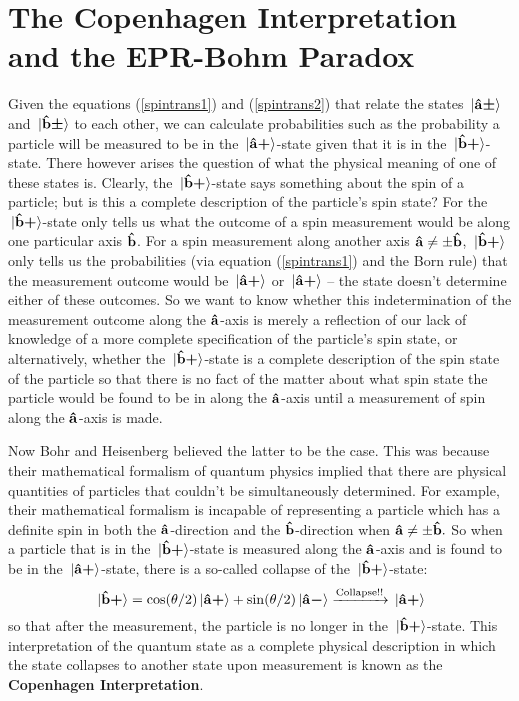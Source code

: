 \section{The Copenhagen Interpretation and the EPR-Bohm Paradox}
Given the equations (\ref{spintrans1}) and (\ref{spintrans2}) that  relate the states $\ket*{\vb{\hat{{a}}}\bm{\pm}}$ and $\ket*{\vb{\hat{{b}}}\bm{\pm}}$ to each other, we can calculate probabilities such as the probability a particle will be measured to be in the $\ket*{\vb{\hat{{a}}}\bm{+}}$-state given that it is in the $\ket*{\vb{\hat{{b}}}\bm{+}}$-state. There however arises the question of what the physical meaning of one of these states is. Clearly, the $\ket*{\vb{\hat{{b}}}\bm{+}}$-state says something about the spin of a particle; but is this a complete description of the particle's spin state? For the $\ket*{\vb{\hat{{b}}}\bm{+}}$-state only tells us what the outcome of a spin measurement would be along one particular axis $\vb{\hat{{b}}}$. For a spin measurement along another axis $\vb{\hat{{a}}}\neq\pm\vb{\hat{{b}}}$, $\ket*{\vb{\hat{{b}}}\bm{+}}$ only tells us the probabilities (via equation (\ref{spintrans1}) and the Born rule) that the measurement outcome would be $\ket*{\vb{\hat{{a}}}\bm{+}}$ or $\ket*{\vb{\hat{{a}}}\bm{+}}$ -- the state doesn't determine either of these outcomes. So we want to know whether this indetermination of the measurement outcome along the $\vb{\hat{{a}}}$-axis is merely a reflection of our lack of knowledge of a more complete specification of the particle's spin state, or alternatively, whether the  $\ket*{\vb{\hat{{b}}}\bm{+}}$-state is a complete description of the spin state of the particle so that there is no fact of the matter about what spin state the particle would be found to be in along the $\vb{\hat{{a}}}$-axis until a measurement of spin along the $\vb{\hat{{a}}}$-axis is made. 

Now Bohr and Heisenberg believed the latter to be the case. This was because their mathematical formalism of quantum physics implied that there are physical quantities of particles that couldn't be simultaneously determined. For example, their mathematical formalism is incapable of representing a particle which has a definite spin in both the $\vb{\hat{{a}}}$-direction and the $\vb{\hat{{b}}}$-direction when $\vb{\hat{{a}}}\neq\pm\vb{\hat{{b}}}.$ So when a particle that is in the $\ket*{\vb{\hat{{b}}}\bm{+}}$-state is measured along the $\vb{\hat{{a}}}$-axis and is found to be in the $\ket*{\vb{\hat{{a}}}\bm{+}}$-state, there is a so-called collapse of the $\ket*{\vb{\hat{{b}}}\bm{+}}$-state:
$$ \ket*{\vb{\hat{{b}}}\bm{+}}= \cos(\theta/2)\ket*{\vb{\hat{{a}}}\bm{+}}+\sin(\theta/2) \ket*{\vb{\hat{{a}}}\bm{-}}\xrightarrow{\text{Collapse!!}}\ket*{\vb{\hat{{a}}}\bm{+}}$$
so that after the measurement, the particle is no longer in the $\ket*{\vb{\hat{{b}}}\bm{+}}$-state. This interpretation of the quantum state as a complete physical description in which the state collapses to another state upon measurement is known as the \textbf{Copenhagen Interpretation}.

